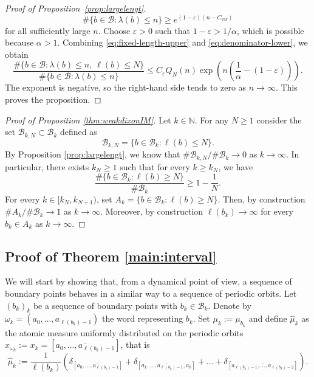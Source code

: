 \documentclass[letterpaper,11pt]{amsart}
\numberwithin{equation}{section}     %
\newcommand{\N}{\mathbb{N}}
\def\N{{\mathbb N}}
\def\B{{\mathcal B}}
\def\le{\leqslant}
\def\ge{\geqslant}
\begin{document}
\begin{proof}[Proof of Proposition~\ref{prop:largelengt}]
\begin{equation}
\#\{b\in\mathcal B:\lambda(b)\le n\}
\ge e^{(1-\varepsilon)(n-C_{\mathrm{var}})}
\end{equation}
for all sufficiently large $n$. Choose $\varepsilon>0$ such that $1-\varepsilon>1/\alpha$, which is possible
because $\alpha>1$. Combining \eqref{eq:fixed-length-upper} and
\eqref{eq:denominator-lower}, we obtain
\[
\frac{
\#\{b\in\mathcal B:\lambda(b)\le n,\ \ell(b)\le N\}
}{
\#\{b\in\mathcal B:\lambda(b)\le n\}
}
\le
C_\varepsilon Q_N(n)
\exp\left(n\left(\frac1{\alpha}-(1-\varepsilon)\right)\right).
\]
The exponent is negative, so the right-hand side tends to zero as
$n\to\infty$. This proves the proposition.
\end{proof}


\begin{proof}[Proof of Proposition \ref{thm:weakdixonIM}] Let $k\in\N$. For any $N\geq 1$ consider the set $\B_{k,N}\subset \B_k$ defined as
\[
\B_{k,N}=\{b\in \B_k : \ell(b)\leq N\}. 
\]
By Proposition \ref{prop:largelengt}, we know that $\# \B_{k,N}/\# \B_k \to 0$ as $k\to\infty$. In particular, there exists $k_N\geq 1$ such that for every $k\geq k_N$, we have
\[
\frac{\#\{b\in \B_k : \ell(b)\geq N\}}{\# \B_k} \geq 1-\frac{1}{N}.
\]
For every $k\in [k_N,k_{N+1})$, set $A_k=\{b\in \B_k : \ell(b)\geq N\}$. Then, by construction $\# A_k/\# \B_k \to 1$ as $k\to\infty$. Moreover, by construction $\ell(b_k)\to\infty$ for every $b_k\in A_k$ as $k\to\infty$.
\end{proof}

\subsection{Proof of Theorem \ref{main:interval}}



We will start by showing that, from a dynamical point of view, a sequence of boundary points behaves in a similar way to a sequence of periodic orbits. Let $(b_k)_k$ be a sequence of boundary points with $b_k\in \B_k$. Denote by $\omega_k=(a_0,\ldots,a_{\ell(b_k)-1})$ the word representing $b_k$. Set $\mu_k:=\mu_{b_k}$ and define $\hat{\mu}_k$ as the atomic measure uniformly distributed on the periodic orbits $x_{\omega_k}:=x_k=[\overline{a_0,\ldots,a_{\ell(b_k)-1}}]$, that is
\[
\hat{\mu}_k := \frac{1}{\ell(b_k)}\left( \delta_{[\overline{a_0,\ldots,a_{\ell(b_k)-1}}]}+\delta_{[\overline{a_1,\ldots,a_{\ell(b_k)-1},a_0}]}+\ldots+ \delta_{[\overline{a_{\ell(b_k)-1},\ldots,a_{\ell(b_k)-2}}]}\right).
\]
\end{document}

